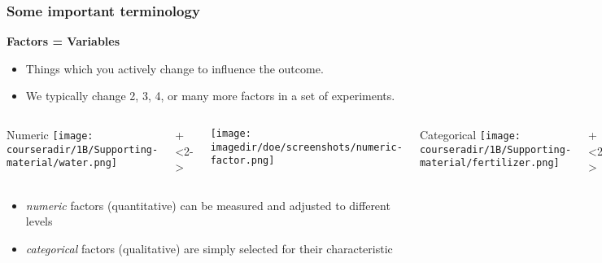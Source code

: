 \documentclass[11pt,aspectratio=169,mathserif]{beamer}
\begin{document}
\begin{frame}\frametitle{Some important terminology}
	\vspace{12pt}
	\textbf{{\color{purple} Factors = Variables}}
		\begin{itemize}
			\item	Things which you actively change to influence the outcome.
			\item	We typically change 2, 3, 4, or many more factors in a set of experiments. 
		\end{itemize}
	
		\begin{columns}[T]
				\centerline{Numeric  \newline	 \texttt{[image: \\courseradir/1B/Supporting-material/water.png]}}
				\onslide+<2->{
					\vspace{0.25cm}
					\centerline{\texttt{[image: \\imagedir/doe/screenshots/numeric-factor.png]}}			
				}
				
				\centerline{Categorical \newline \texttt{[image: \\courseradir/1B/Supporting-material/fertilizer.png]}}			
				\onslide+<2->{
					\vspace{0.25cm}
					\centerline{\texttt{[image: \\imagedir/doe/screenshots/categorical-factor.png]}}			
				}				
		\end{columns}


		\begin{itemize}
			\item	\emph{numeric} factors (quantitative) can be measured and adjusted to different levels
			\item	\emph{categorical} factors (qualitative) are simply selected for their characteristic
		\end{itemize}	

\end{frame}
\end{document}
